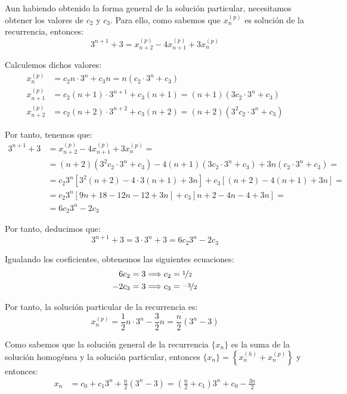 \begin{ejercicio}
    Aun habiendo obtenido la forma general de la solución particular, necesitamos obtener los valores de $c_2$ y $c_3$.
    Para ello, como sabemos que $x_n^{(p)}$ es solución de la recurrencia, entonces:
    \begin{equation*}
        3^{n+1} + 3 = x_{n+2}^{(p)} - 4x_{n+1}^{(p)} + 3x_n^{(p)}
    \end{equation*}

    Calculemos dichos valores:
    \begin{align*}
        x_n^{(p)} &= c_2n\cdot 3^n + c_3n = n(c_2\cdot 3^n + c_3)\\
        x_{n+1}^{(p)} &= c_2(n+1)\cdot 3^{n+1} + c_3(n+1)
        = (n+1)(3c_2\cdot 3^{n} + c_3)\\
        x_{n+2}^{(p)} &= c_2(n+2)\cdot 3^{n+2} + c_3(n+2)
        = (n+2)(3^2c_2\cdot 3^{n} + c_3)
    \end{align*}

    Por tanto, tenemos que:
    \begin{align*}
        3^{n+1} + 3 &= x_{n+2}^{(p)} - 4x_{n+1}^{(p)} + 3x_n^{(p)} =\\
        &= (n+2)(3^2c_2\cdot 3^{n} + c_3) - 4(n+1)(3c_2\cdot 3^{n} + c_3) + 3n(c_2\cdot 3^n + c_3) =\\
        &= c_2 3^n[3^2(n+2) - 4\cdot 3(n+1) + 3n] + c_3[(n+2) - 4(n+1) + 3n] =\\
        &= c_2 3^n[9n + 18 - 12n - 12 + 3n] + c_3[n+2 - 4n - 4 + 3n] =\\
        &= 6c_2 3^n -2c_3
    \end{align*}

    Por tanto, deducimos que:
    \begin{equation*}
        3^{n+1} + 3 = 3\cdot 3^n + 3 = 6c_2 3^n -2c_3
    \end{equation*}

    Igualando los coeficientes, obtenemos las siguientes ecuaciones:
    \begin{align*}
        6c_2 &= 3 \Longrightarrow c_2 = \nicefrac{1}{2} \\
        -2c_3 &= 3 \Longrightarrow c_3 = \nicefrac{-3}{2}
    \end{align*}

    Por tanto, la solución particular de la recurrencia es:
    \begin{equation*}
        x_n^{(p)} = \frac{1}{2}n\cdot 3^n - \frac{3}{2}n
        = \frac{n}{2}\left(3^n - 3\right)
    \end{equation*}

    Como sabemos que la solución general de la recurrencia $\{x_n\}$ es la suma de la solución homogénea y la solución particular, entonces
    $\{x_n\} = \left\{x_n^{(h)} + x_n^{(p)}\right\}$ y entonces:
    \begin{align*}
        x_n &= c_0 + c_1 3^n + \frac{n}{2}\left(3^n - 3\right) 
        = \left(\frac{n}{2} + c_1\right)3^n + c_0 - \frac{3n}{2}
    \end{align*}
\end{ejercicio}


